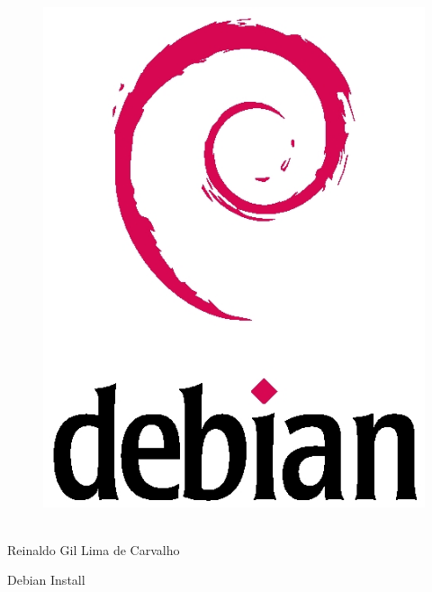\thispagestyle{empty}

\begin{center}
  \begin{figure}[H]
    \begin{center}
      \hspace{-1cm}
      \includegraphics[width=0.55\columnwidth]{titlepage}
  ~\cite{FrontPageIMG}
    \end{center}      
  \end{figure}

  \vskip 2cm

  \hspace{-1cm}
  \begin{minipage}[c]{17cm}
    \begin{center}

{\huge {}\vskip 0.15cm %

{\large Reinaldo Gil Lima de Carvalho} %
}
    \end{center}
  \end{minipage}

  \vskip 7cm

  {\huge Debian Install} %

\end{center}
